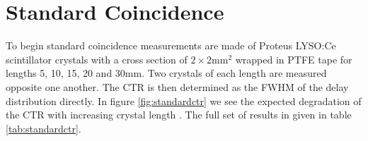 \section{Standard Coincidence}
\label{sec:standardctr}
To begin standard coincidence measurements are made of Proteus LYSO:Ce scintillator crystals with a cross section of $2\times2$mm$^2$ wrapped in PTFE tape for lengths 5, 10, 15, 20 and 30mm. Two crystals of each length are measured opposite one another. The CTR is then determined as the FWHM of the delay distribution directly. In figure \ref{fig:standardctr} we see the expected degradation of the CTR with increasing crystal length \cite{r_Paganoni_Pauwels_et_al__2011}\cite{Wiener_Kaul_Surti_Karp_2010}\cite{Choong_2009}\cite{Gola_Piemonte_Tarolli_2013}\cite{o_Pro_Serra_Tarolli_Zorzi_2011}. The full set of results in given in table \ref{tab:standardctr}.